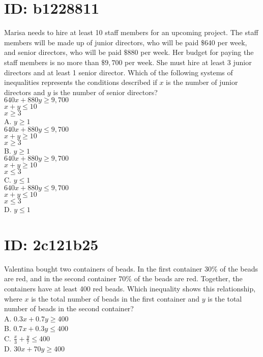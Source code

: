 \section*{ID: b1228811}
Marisa needs to hire at least 10 staff members for an upcoming project. The staff members will be made up of junior directors, who will be paid $\$ 640$ per week, and senior directors, who will be paid $\$ 880$ per week. Her budget for paying the staff members is no more than $\$ 9,700$ per week. She must hire at least 3 junior directors and at least 1 senior director. Which of the following systems of inequalities represents the conditions described if $x$ is the number of junior directors and $y$ is the number of senior directors?\\
$640 x+880 y \geq 9,700$\\
$x+y \leq 10$\\
$x \geq 3$\\
A. $y \geq 1$\\
$640 x+880 y \leq 9,700$\\
$x+y \geq 10$\\
$x \geq 3$\\
B. $y \geq 1$\\
$640 x+880 y \geq 9,700$\\
$x+y \geq 10$\\
$x \leq 3$\\
C. $y \leq 1$\\
$640 x+880 y \leq 9,700$\\
$x+y \leq 10$\\
$x \leq 3$\\
D. $y \leq 1$





\section*{ID: 2c121b25}
Valentina bought two containers of beads. In the first container 30\% of the beads are red, and in the second container $70 \%$ of the beads are red. Together, the containers have at least 400 red beads. Which inequality shows this relationship, where $x$ is the total number of beads in the first container and $y$ is the total number of beads in the second container?\\
A. $0.3 x+0.7 y \geq 400$\\
B. $0.7 x+0.3 y \leq 400$\\
C. $\frac{x}{3}+\frac{y}{7} \leq 400$\\
D. $30 x+70 y \geq 400$







